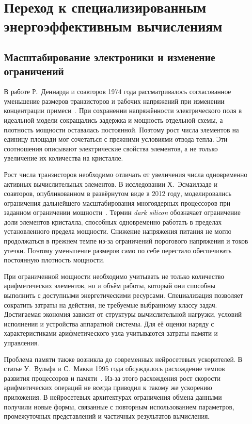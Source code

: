 \section{Переход к специализированным энергоэффективным вычислениям}

\subsection{Масштабирование электроники и изменение ограничений}

В работе Р.~Деннарда и соавторов 1974 года рассматривалось
согласованное уменьшение размеров транзисторов и рабочих
напряжений при изменении концентрации примеси~\cite{dennard1974}.
При сохранении напряжённости электрического поля в идеальной
модели сокращались задержка и мощность отдельной схемы,
а плотность мощности оставалась постоянной. Поэтому рост числа
элементов на единицу площади мог сочетаться с прежними условиями
отвода тепла. Эти соотношения описывают электрические свойства
элементов, а не только увеличение их количества на кристалле.

Рост числа транзисторов необходимо отличать от увеличения числа
одновременно активных вычислительных элементов. В исследовании Х.~Эсмаилзаде
и соавторов, опубликованном в развёрнутом виде в 2012 году,
моделировались ограничения дальнейшего масштабирования многоядерных
процессоров при заданном ограничении мощности~\cite{dark2012}.
Термин \textit{dark silicon} обозначает ограничение доли элементов
кристалла, способных одновременно работать в пределах установленного
предела мощности. Снижение напряжения питания не могло продолжаться
в прежнем темпе из-за ограничений порогового напряжения
и токов утечки. Поэтому уменьшение размеров само по себе
перестало обеспечивать постоянную плотность мощности.

При ограниченной мощности необходимо учитывать не только количество
арифметических элементов, но и объём работы, который они способны выполнить с
доступными энергетическими ресурсами. Специализация позволяет
сократить затраты на действия, не требуемые выбранному классу задач.
Достигаемая экономия зависит от структуры вычислительной нагрузки, условий
исполнения и устройства аппаратной системы. Для её оценки наряду с
характеристиками арифметического узла учитываются затраты памяти и управления.

Проблема памяти также возникла до современных нейросетевых ускорителей.
В статье У.~Вульфа и С.~Макки 1995 года обсуждалось расхождение темпов
развития процессоров и памяти~\cite{wulf1995}. Из-за этого расхождения рост скорости арифметических операций не всегда
приводил к такому же ускорению приложения. В нейросетевых архитектурах
ограничения обмена данными получили новые формы, связанные
с повторным использованием параметров, промежуточных представлений
и частичных результатов вычисления.


